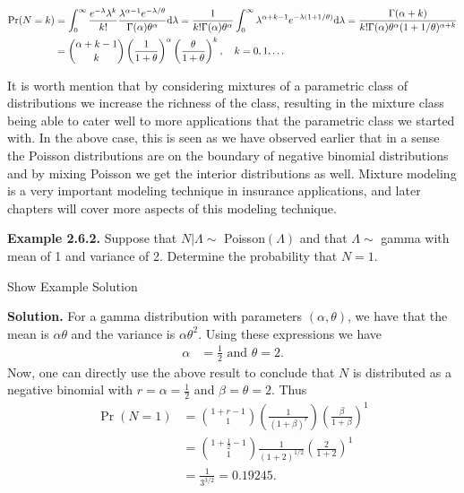 \documentclass[]{book}
\theoremstyle{definition}
\theoremstyle{definition}
\theoremstyle{definition}
\theoremstyle{remark}
\begin{document}
\begin{align*}
\Pr(N=k)&= \int_0^\infty \frac{e^{-\lambda}\lambda^k}{k!} \frac{\lambda^{\alpha-1}e^{-\lambda/\theta}}{\Gamma{(\alpha)}\theta^{\alpha}} {\rm d}\lambda = 
\frac{1}{k!\Gamma(\alpha)\theta^\alpha}\int_0^\infty \lambda^{\alpha+k-1}e^{-\lambda(1+1/\theta)}{\rm d}\lambda=\frac{\Gamma{(\alpha+k)}}{k!\Gamma(\alpha)\theta^\alpha(1+1/\theta)^{\alpha+k}} \\
&=\binom{\alpha+k-1}{k}\left(\frac{1}{1+\theta}\right)^\alpha\left(\frac{\theta}{1+\theta}\right)^k, \quad k=0,1,\ldots
\end{align*}

It is worth mention that by considering mixtures of a parametric class
of distributions we increase the richness of the class, resulting in the
mixture class being able to cater well to more applications that the
parametric class we started with. In the above case, this is seen as we
have observed earlier that in a sense the Poisson distributions are on
the boundary of negative binomial distributions and by mixing Poisson we
get the interior distributions as well. Mixture modeling is a very
important modeling technique in insurance applications, and later
chapters will cover more aspects of this modeling technique.

\textbf{Example 2.6.2.} Suppose that \(N|\Lambda \sim\)
Poisson\((\Lambda)\) and that \(\Lambda \sim\) gamma with mean of 1 and
variance of 2. Determine the probability that \(N=1\).

Show Example Solution

\hypertarget{toggleExampleFreq.6.2}{}
\textbf{Solution.} For a gamma distribution with parameters
\((\alpha, \theta)\), we have that the mean is \(\alpha \theta\) and the
variance is \(\alpha \theta^2\). Using these expressions we have \[
\begin{aligned}
\alpha &= \frac{1}{2} \text{   and   } \theta =2.
\end{aligned}
\] Now, one can directly use the above result to conclude that \(N\) is
distributed as a negative binomial with \(r = \alpha = \frac{1}{2}\) and
\(\beta= \theta =2\). Thus \[
\begin{aligned}
\Pr(N=1)  &= \binom{1+r-1}{1}(\frac{1}{(1+\beta)^r})\left(\frac{\beta}{1+\beta}\right)^1 \\
&=                 \binom{1+\frac{1}{2}-1}{1}{\frac{1}{(1+2)^{1/2}}}\left(\frac{2}{1+2}\right)^1\\
&=  \frac{1}{3^{3/2}} = 0.19245 .
\end{aligned}
\]
\end{document}
